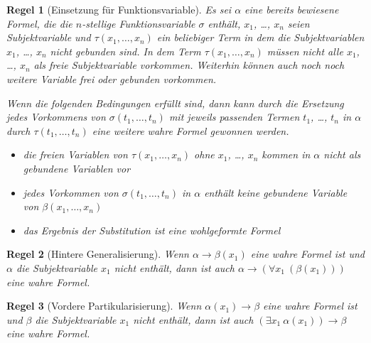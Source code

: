 \documentclass[a4paper,german,10pt,twoside]{book}
\newtheorem{rul}{Regel}
\theoremstyle{definition}
\theoremstyle{remark}
\begin{document}
\begin{rul}[Einsetzung f{\"u}r Funktionsvariable]
\label{rule:replaceFunct} \hypertarget{rule:replaceFunct}{}
Es sei $\alpha$ eine bereits bewiesene Formel, die die $n$-stellige Funktionsvariable $\sigma$ enth{\"a}lt, $x_1$, \ldots, $x_n$ seien Subjektvariable und 
$\tau(x_1, \ldots, x_n)$ ein beliebiger Term in dem die Subjektvariablen $x_1$, \ldots, $x_n$ nicht gebunden sind. In dem Term $\tau(x_1, \ldots, x_n)$ m{\"u}ssen nicht alle $x_1$, \ldots, $x_n$ als freie Subjektvariable vorkommen. Weiterhin k{\"o}nnen auch noch  noch weitere Variable frei oder gebunden vorkommen.

Wenn die folgenden Bedingungen erf{\"u}llt sind, dann kann durch die Ersetzung jedes Vorkommens von $\sigma(t_1, \ldots, t_n)$ mit jeweils passenden Termen $t_1$, \ldots, $t_n$ in $\alpha$ durch $\tau(t_1, \ldots, t_n)$
eine weitere wahre Formel gewonnen werden.

\begin{itemize}

\item
die freien Variablen von $\tau(x_1, \ldots, x_n)$ ohne $x_1$, \ldots, $x_n$ kommen in $\alpha$ nicht als gebundene Variablen vor

\item
jedes Vorkommen von $\sigma(t_1, \ldots, t_n)$ in $\alpha$ enth{\"a}lt keine gebundene Variable von $\beta(x_1, \ldots, x_n)$

\item
das Ergebnis der Substitution ist eine wohlgeformte Formel

\end{itemize}
\end{rul}




\par


\begin{rul}[Hintere Generalisierung]
\label{rule:universalIntroduction} \hypertarget{rule:universalIntroduction}{}
Wenn $\alpha \rightarrow \beta(x_1)$ eine wahre Formel ist und $\alpha$ die Subjektvariable $x_1$ nicht enth{\"a}lt, dann ist auch $\alpha \rightarrow (\forall x_1~(\beta(x_1)))$ eine wahre Formel.
\end{rul}




\par


\begin{rul}[Vordere Partikularisierung]
\label{rule:existentialIntroduction} \hypertarget{rule:existentialIntroduction}{}
Wenn $\alpha(x_1) \rightarrow \beta$ eine wahre Formel ist und $\beta$ die Subjektvariable $x_1$ nicht enth{\"a}lt, dann ist auch $(\exists x_1~\alpha(x_1)) \rightarrow \beta$ eine wahre Formel.
\end{rul}
\end{document}
